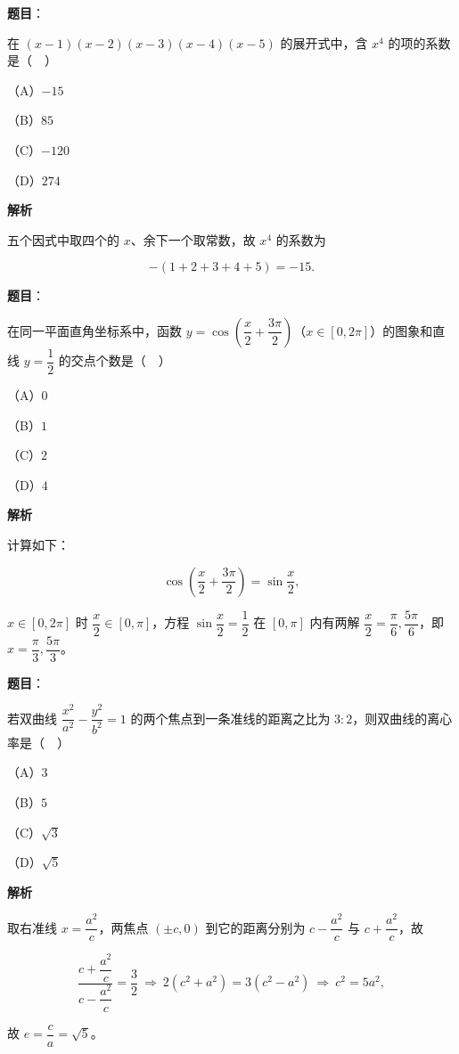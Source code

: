 \begin{answer}

\textbf{题目}：

在 $(x-1)(x-2)(x-3)(x-4)(x-5)$ 的展开式中，含 $x^4$ 的项的系数是（　）

（A）$-15$

（B）$85$

（C）$-120$

（D）$274$

\textbf{解析}

五个因式中取四个的 $x$、余下一个取常数，故 $x^4$ 的系数为

\nopagebreak[4]
\[-(1+2+3+4+5)=-15.\]


\end{answer}
\begin{answer}

\textbf{题目}：

在同一平面直角坐标系中，函数 $y=\cos\left(\dfrac x2+\dfrac{3\pi}2\right)$（$x\in[0,2\pi]$）的图象和直线 $y=\dfrac12$ 的交点个数是（　）

（A）$0$

（B）$1$

（C）$2$

（D）$4$

\textbf{解析}

计算如下：

\nopagebreak[4]
\[\cos\left(\frac x2+\frac{3\pi}2\right)=\sin\frac x2,\]

$x\in[0,2\pi]$ 时 $\dfrac x2\in[0,\pi]$，方程 $\sin\dfrac x2=\dfrac12$ 在 $[0,\pi]$ 内有两解 $\dfrac x2=\dfrac{\pi}6,\dfrac{5\pi}6$，即 $x=\dfrac{\pi}3,\dfrac{5\pi}3$。


\end{answer}
\begin{answer}

\textbf{题目}：

若双曲线 $\dfrac{x^2}{a^2}-\dfrac{y^2}{b^2}=1$ 的两个焦点到一条准线的距离之比为 $3:2$，则双曲线的离心率是（　）

（A）$3$

（B）$5$

（C）$\sqrt3$

（D）$\sqrt5$

\textbf{解析}

取右准线 $x=\dfrac{a^2}c$，两焦点 $(\pm c,0)$ 到它的距离分别为 $c-\dfrac{a^2}c$ 与 $c+\dfrac{a^2}c$，故

\nopagebreak[4]
\[\frac{c+\dfrac{a^2}c}{c-\dfrac{a^2}c}=\frac32\ \Longrightarrow\ 2\left(c^2+a^2\right)=3\left(c^2-a^2\right)\ \Longrightarrow\ c^2=5a^2,\]

故 $e=\dfrac ca=\sqrt5$。


\end{answer}

